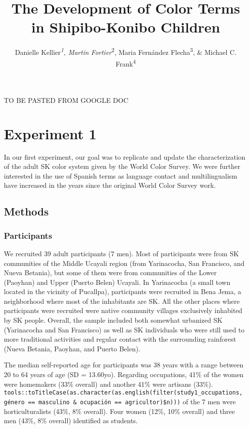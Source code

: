 \documentclass[,man,floatsintext]{apa6}
\title{The Development of Color Terms in Shipibo-Konibo Children}
\author{Danielle Kellier\emph{\textsuperscript{1}, Martin
Fortier}\textsuperscript{2}, Maria Fernández Flecha\textsuperscript{3},
\& Michael C. Frank\textsuperscript{4}}
\date{}
\affiliation{
\vspace{0.5cm}
\textsuperscript{1} University of Pennsylvania\\\textsuperscript{2} PSL Research University\\\textsuperscript{3} Pontificia Universidad Católica del Perú\\\textsuperscript{4} Stanford University}
\theoremstyle{definition}
\theoremstyle{definition}
\theoremstyle{definition}
\theoremstyle{remark}
\begin{document}
\maketitle

TO BE PASTED FROM GOOGLE DOC

\section{Experiment 1}\label{experiment-1}

In our first experiment, our goal was to replicate and update the
characterization of the adult SK color system given by the World Color
Survey. We were further interested in the use of Spanish terms as
language contact and multilingualism have increased in the years since
the original World Color Survey work.

\subsection{Methods}\label{methods}

\subsubsection{Participants}\label{participants}

We recruited 39 adult participants (7 men). Most of participants were
from SK communities of the Middle Ucayali region (from Yarinacocha, San
Francisco, and Nueva Betania), but some of them were from communities of
the Lower (Paoyhan) and Upper (Puerto Belen) Ucayali. In Yarinacocha (a
small town located in the vicinity of Pucallpa), participants were
recruited in Bena Jema, a neighborhood where most of the inhabitants are
SK. All the other places where participants were recruited were native
community villages exclusively inhabited by SK people. Overall, the
sample included both somewhat urbanized SK (Yarinacocha and San
Francisco) as well as SK individuals who were still used to more
traditional activities and regular contact with the surrounding
rainforest (Nueva Betania, Paoyhan, and Puerto Belen).

The median self-reported age for participants was 38 years with a range
between 20 to 64 years of age (SD = 13.60yo). Regarding occupations,
41\% of the women were homemakers (33\% overall) and another 41\% were
artisans (33\%).
\texttt{tools::toTitleCase(as.character(as.english(filter(study1\_occupations,\ género\ ==\ \textquotesingle{}masculino\textquotesingle{}\ \&\ ocupación\ ==\ \textquotesingle{}agricultor\textquotesingle{})\$n)))}
of the 7 men were horticulturalists (43\%, 8\% overall). Four women
(12\%, 10\% overall) and three men (43\%, 8\% overall) identified as
students.
\end{document}
